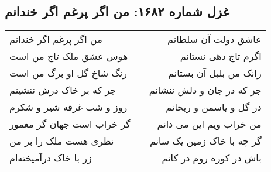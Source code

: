 \begin{center}
\section*{غزل شماره ۱۶۸۲: من اگر پرغم اگر خندانم}
\label{sec:1682}
\begin{longtable}{l p{0.5cm} r}
من اگر پرغم اگر خندانم
&&
عاشق دولت آن سلطانم
\\
هوس عشق ملک تاج من است
&&
اگرم تاج دهی نستانم
\\
رنگ شاخ گل او برگ من است
&&
زانک من بلبل آن بستانم
\\
جز که بر خاک درش ننشینم
&&
جز که در جان و دلش ننشانم
\\
روز و شب غرقه شیر و شکرم
&&
در گل و یاسمن و ریحانم
\\
گر خراب است جهان گر معمور
&&
من خراب ویم این می دانم
\\
نظری هست ملک را بر من
&&
گر چه با خاک زمین یک سانم
\\
زر با خاک درآمیخته‌ام
&&
باش در کوره روم در کانم
\\
\end{longtable}
\end{center}

